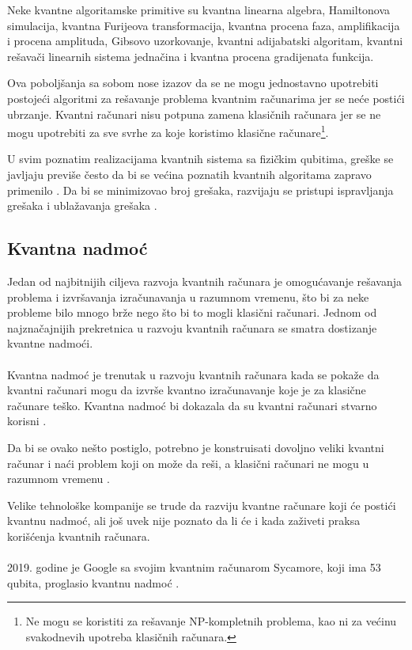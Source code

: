 \documentclass[fleqn, 12pt]{article}
\begin{document}
\begin{text}
Neke kvantne algoritamske primitive su kvantna linearna algebra, Hamiltonova simulacija, kvantna Furijeova transformacija, kvantna procena faza, amplifikacija i procena amplituda, Gibsovo uzorkovanje, kvantni adijabatski algoritam, kvantni rešavači linearnih sistema jednačina i kvantna procena gradijenata funkcija.

Ova poboljšanja sa sobom nose izazov da se ne mogu jednostavno upotrebiti postojeći algoritmi za rešavanje problema kvantnim računarima jer se neće postići ubrzanje. Kvantni računari nisu potpuna zamena klasičnih računara jer se ne mogu upotrebiti za sve svrhe za koje koristimo klasične računare\footnote{Ne mogu se koristiti za rešavanje NP-kompletnih problema, kao ni za većinu svakodnevih upotreba klasičnih računara.}.

U svim poznatim realizacijama kvantnih sistema sa fizičkim qubitima, greške se javljaju previše često da bi se većina poznatih kvantnih algoritama zapravo primenilo \cite{G2}. Da bi se minimizovao broj grešaka, razvijaju se pristupi ispravljanja grešaka i ublažavanja grešaka \cite{G1}.
\end{text}

\newpage

\subsection{Kvantna nadmoć}

\begin{text}
Jedan od najbitnijih ciljeva razvoja kvantnih računara je omogućavanje rešavanja problema i izvršavanja izračunavanja u razumnom vremenu, što bi za neke probleme bilo mnogo brže nego što bi to mogli klasični računari. Jednom od najznačajnijih prekretnica u razvoju kvantnih računara se smatra dostizanje kvantne nadmoći.
\\\\

Kvantna nadmoć je trenutak u razvoju kvantnih računara kada se pokaže da kvantni računari mogu da izvrše kvantno izračunavanje koje je za klasične računare teško. Kvantna nadmoć bi dokazala da su kvantni računari stvarno korisni \cite{G1}.

Da bi se ovako nešto postiglo, potrebno je konstruisati dovoljno veliki kvantni računar i naći problem koji on može da reši, a klasični računari ne mogu u razumnom vremenu \cite{G1}.

Velike tehnološke kompanije se trude da razviju kvantne računare koji će postići kvantnu nadmoć, ali još uvek nije poznato da li će i kada zaživeti praksa korišćenja kvantnih računara.
\\\\

2019. godine je Google sa svojim kvantnim računarom Sycamore, koji ima 53 qubita, proglasio kvantnu nadmoć \cite{G8}.
\end{text}
\end{document}
